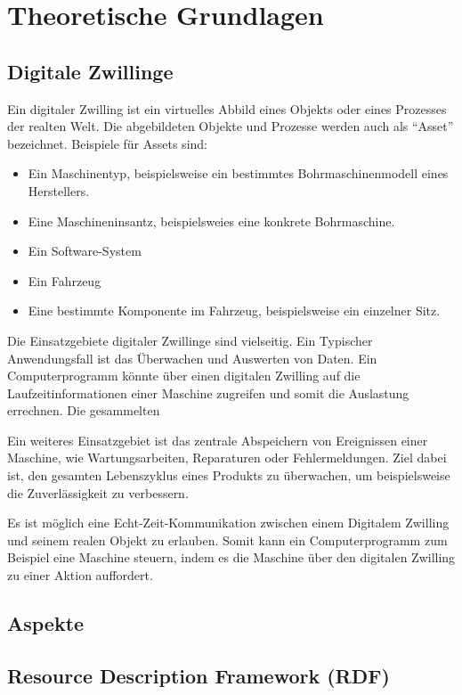 \chapter{Theoretische Grundlagen}
\fancyhfStyleContent{}


\section{Digitale Zwillinge}

Ein digitaler Zwilling ist ein virtuelles Abbild eines Objekts oder eines Prozesses der realten Welt. Die abgebildeten Objekte und Prozesse werden auch als "`Asset"' bezeichnet. Beispiele für Assets sind:
\begin{itemize}
	\item Ein Maschinentyp, beispielsweise ein bestimmtes Bohrmaschinenmodell eines Herstellers.
	\item Eine Maschineninsantz, beispielsweies eine konkrete Bohrmaschine.
	\item Ein Software-System
	\item Ein Fahrzeug
	\item Eine bestimmte Komponente im Fahrzeug, beispielsweise ein einzelner Sitz.
\end{itemize}

Die Einsatzgebiete digitaler Zwillinge sind vielseitig. Ein Typischer Anwendungsfall ist das Überwachen und Auswerten von Daten. Ein Computerprogramm könnte über einen digitalen Zwilling auf die Laufzeitinformationen einer Maschine zugreifen und somit die Auslastung errechnen. Die gesammelten 

Ein weiteres Einsatzgebiet ist das zentrale Abspeichern von Ereignissen einer Maschine, wie Wartungsarbeiten, Reparaturen oder Fehlermeldungen. Ziel dabei ist, den gesamten Lebenszyklus eines Produkts zu überwachen, um beispielsweise die Zuverlässigkeit zu verbessern.

Es ist möglich eine Echt-Zeit-Kommunikation zwischen einem Digitalem Zwilling und seinem realen Objekt zu erlauben. Somit kann ein Computerprogramm zum Beispiel eine Maschine steuern, indem es die Maschine über den digitalen Zwilling zu einer Aktion auffordert.



\section{Aspekte}
\section{Resource Description Framework (RDF)}

